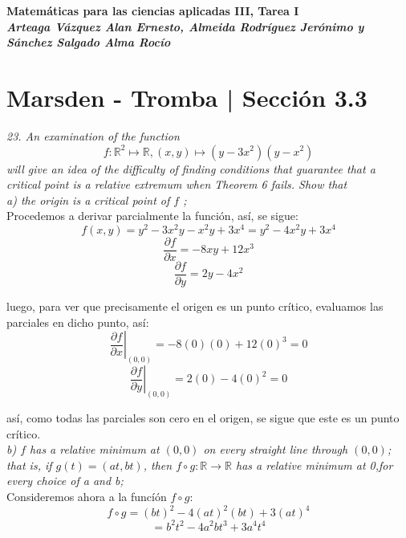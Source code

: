 \documentclass[a4paper,12pt]{article}
\begin{document}
\newcommand{\osf}[2]{\dfrac{#1^2}{#2^2}}
\newcommand{\T}{\Big(2\pi\cdot\sqrt{\dfrac{l}{g}}\Big)}
\newcommand{\alpa}{\dfrac{e^{x \beta -3}{2y\beta +5}}}
\newcommand{\deriv}[2]{\dfrac{\delta #1}{\delta #2}}
\newcommand{\ext}{e^{ax-bt}}
\newcommand{\exy}{e^{((x-1)^2 + (y-3)^2}}
\begin{center}
	\textbf{Matemáticas para las ciencias aplicadas III, Tarea I}\\
	\textbf{\textit{Arteaga Vázquez Alan Ernesto, Almeida Rodríguez Jerónimo
					y Sánchez Salgado Alma Rocío}}
\end{center}

\newpage

\section{Marsden - Tromba | Sección 3.3}

\textit{23. An examination of the function}
	$$f:\mathbb{R}^2 \mapsto \mathbb{R}, (x, y) \mapsto (y -3x^2)(y -x^2)$$
	\textit{will give an idea of the difficulty of finding conditions that
			guarantee that a critical point is a relative extremum when Theorem
			6 fails. Show that}\\

	\textit{a) the origin is a critical point of $f$ ;}\\

	Procedemos a derivar parcialmente la función, así, se sigue:
	$$f(x,y) = y^2 -3x^2y -x^2y + 3x^4 = y^2 -4x^2y + 3x^4  $$
	$$\frac{\partial f}{\partial x} = -8xy + 12x^3 $$
	$$\frac{\partial f}{\partial y} = 2y - 4x^2 $$

	luego, para ver que precisamente el origen es un punto crítico,
	evaluamos las parciales en dicho punto, así:
	$$\left. \frac{\partial f}{\partial x} \right|_{(0,0)}
			= -8(0)(0) + 12(0)^3 = 0 $$
	$$\left. \frac{\partial f}{\partial y} \right|_{(0,0)}
			= 2(0) - 4(0)^2 = 0 $$

	así, como todas las parciales son cero en el origen, se sigue que este es
	un punto crítico.\\

	\textit{b) $f$ has a relative minimum at $(0, 0)$ on every straight line
			through $(0, 0)$; that is, if $g(t) = (at, bt)$, then
			$f \circ g : \mathbb{R} \rightarrow \mathbb{R}$ has a relative
			minimum at 0,for every choice of a and b;}\\

		Consideremos ahora a la funcíón $f \circ g$:
		$$ f \circ g = (bt)^2 - 4(at)^2(bt) + 3(at)^4$$
		$$ = b^2t^2 - 4a^2bt^3 + 3a^4t^4$$
\end{document}
